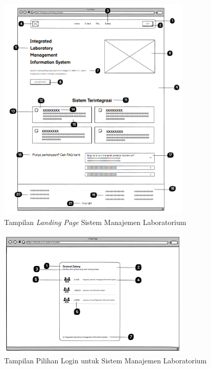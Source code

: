 \begin{figure}
	\centering
	\includegraphics[width=0.82\textwidth]{konten/gambar/landing-page.png}
	\caption{Tampilan \textit{Landing Page} Sistem Manajemen Laboratorium}
	\label{fig:landing-page-interface}
\end{figure}

\begin{figure}
	\centering
	\includegraphics[width=0.82\textwidth]{konten/gambar/pilih-login.png}
	\caption{Tampilan Pilihan Login untuk Sistem Manajemen Laboratorium}
	\label{fig:pilih-login-interface}
\end{figure}

